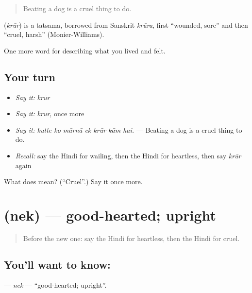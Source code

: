 \begin{quote}
Beating a dog is a cruel thing to do.
\end{quote}

\begin{cousinweb}
\textbf{} (\emph{krūr}) is a tatsama, borrowed from Sanskrit \emph{krūra}, first \textquotedblleft{}wounded, sore\textquotedblright{} and then \textquotedblleft{}cruel, harsh\textquotedblright{} (Monier-Williams).
\end{cousinweb}

\begin{grammarlens}[title={What you've built}]
One more word for describing what you lived and felt.
\end{grammarlens}

\subsection*{Your turn}
\begin{itemize}
\raggedright
  \item \emph{Say it:} \emph{krūr}
  \item \emph{Say it:} \emph{krūr}, once more
  \item \emph{Say it:} \emph{kutte ko mārnā ek krūr kām hai.} — Beating a dog is a cruel thing to do.
  \item \emph{Recall:} say the Hindi for wailing, then the Hindi for heartless, then say \emph{krūr} again
\end{itemize}

\begin{tcolorbox}[breakable,colback=teal!4,colframe=teal!35!black,title={Before you move on}]
What does  mean? (\textquotedblleft{}Cruel\textquotedblright{}.) Say it once more.
\end{tcolorbox}
\section[\texorpdfstring{\hi{नेक} (nek)}{नेक (nek)}]{ (nek) — good-hearted; upright}

\label{lesson:HI-C466-nek}



\begin{quote}
Before the new one: say the Hindi for heartless, then the Hindi for cruel.
\end{quote}

\subsection*{You'll want to know: }
\textbf{} — \emph{nek} — \textquotedblleft{}good-hearted; upright\textquotedblright{}.

